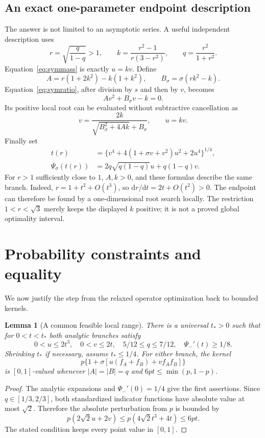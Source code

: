 \documentclass[11pt]{article}
\newtheorem{lemma}[theorem]{Lemma}
\theoremstyle{definition}
\newcommand{\1}{\mathbf 1}
\begin{document}
\subsection{An exact one-parameter endpoint description}\label{sec:param}
The answer is not limited to an asymptotic series. A useful independent description uses
\[
 r=\sqrt{\frac q{1-q}}>1,\qquad
 k=\frac{r^2-1}{r(3-r^2)},\qquad q=\frac{r^2}{1+r^2}.
\]
Equation~\eqref{eq:symmass} is exactly $u=kv$. Define
\[
 A=r(1+2k^2)-k(1+k^2),\qquad
 B_\sigma=\sigma(rk^2-k).
\]
Equation~\eqref{eq:symratio}, after division by $s$ and then by $v$, becomes
\[
 Av^2+B_\sigma v-k=0.
\]
Its positive local root can be evaluated without subtractive cancellation as
\begin{equation}\label{eq:paramroot}
 v=\frac{2k}{\sqrt{B_\sigma^2+4Ak}+B_\sigma},\qquad u=kv.
\end{equation}
Finally set
\begin{align}
 t(r)&=\{v^4+4(1+\sigma v+v^2)u^2+2u^4\}^{1/4},\label{eq:paramt}\\
 \Psi_\sigma(t(r))&=2q\sqrt{q(1-q)}u+q(1-q)v.\label{eq:paramvalue}
\end{align}
For $r>1$ sufficiently close to $1$, $A,k>0$, and these formulas describe the same branch. Indeed, $r=1+t^2+O(t^3)$, so $\mathrm dr/\mathrm dt=2t+O(t^2)>0$. The endpoint can therefore be found by a one-dimensional root search locally. The restriction $1<r<\sqrt3$ merely keeps the displayed $k$ positive; it is not a proved global optimality interval.

\section{Probability constraints and equality}\label{sec:realization}
We now justify the step from the relaxed operator optimization back to bounded kernels.

\begin{lemma}[A common feasible local range]\label{lem:box}
There is a universal $t_*>0$ such that for $0<t<t_*$ both analytic branches satisfy
\[
 0<u\le2t^3,\quad 0<v\le2t,\quad
 5/12\le q\le7/12,\quad \Psi_-'(t)\ge1/8.
\]
Shrinking $t_*$ if necessary, assume $t_*\le1/4$. For either branch, the kernel
\[
 p\{1+\sigma[u(f_A+f_B)+vf_Af_B]\}
\]
is $[0,1]$-valued whenever $|A|=|B|=q$ and $6pt\le\min(p,1-p)$.
\end{lemma}
\begin{proof}
The analytic expansions and $\Psi_-'(0)=1/4$ give the first assertions. Since $q\in[1/3,2/3]$, both standardized indicator functions have absolute value at most $\sqrt2$. Therefore the absolute perturbation from $p$ is bounded by
\[
 p(2\sqrt2u+2v)\le p(4\sqrt2t^3+4t)\le6pt.
\]
The stated condition keeps every point value in $[0,1]$.
\end{proof}
\end{document}
